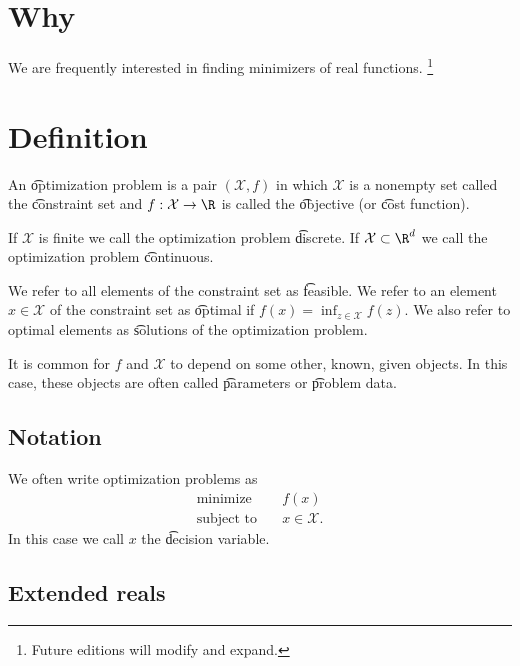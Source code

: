 
\section*{Why}

We are frequently interested in finding minimizers of real functions.
  \ifhmode\unskip\fi\footnote{
Future editions will modify and expand.
  }

\section*{Definition}

An \t{optimization problem} is a pair $(\mathcal{X} , f)$ in which $\mathcal{X} $ is a nonempty set called the \t{constraint set} and $f: \mathcal{X}  \to \R $ is called the \t{objective} (or \t{cost function}).

If $\mathcal{X} $ is finite we call the optimization problem \t{discrete}.
If $\mathcal{X}  \subset \R ^d$ we call the optimization problem \t{continuous}.

We refer to all elements of the constraint set as \t{feasible}.
We refer to an element $x \in \mathcal{X} $ of the constraint set as \t{optimal} if $f(x) = \inf_{z \in \mathcal{X} }f(z)$.
We also refer to optimal elements as \t{solutions} of the optimization problem.

It is common for $f$ and $\mathcal{X} $ to depend on some other, known, given objects.
In this case, these objects are often called \t{parameters} or \t{problem data}.

\subsection*{Notation}

We often write optimization problems as
  \[
\begin{aligned}
\text{minimize}\quad & f(x) \\
\text{subject to}\quad & x \in \mathcal{X} .
\end{aligned}
  \]
In this case we call $x$ the \t{decision variable}.

\subsection*{Extended reals}

